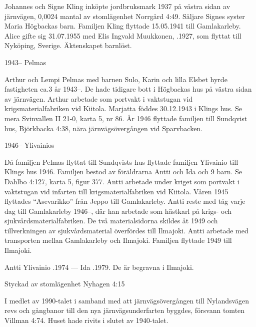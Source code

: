 Johannes och Signe Kling inköpte jordbruksmark 1937 på västra sidan av	järnvägen, 0,0024 mantal av stomlägenhet Norrgård 4:49. Säljare Signes syster Maria Högbackas barn.	Familjen Kling flyttade 15.05.1941 till Gamlakarleby. Alice gifte sig 31.07.1955 med Elis Ingvald Muukkonen, .1927, som flyttat till Nyköping, Sverige. Äktenskapet barnlöst.


1943--	Pelmas

Arthur och Lempi Pelmas med barnen Sulo, Karin och lilla Elsbet hyrde fastigheten ca.3 år 1943--. De hade tidigare bott i Högbackas hus på västra sidan av järnvägen. Arthur arbetade som portvakt i vaktstugan vid 	krigsmaterialfabriken vid Kiitola. Marjatta föddes 30.12.1943 i Klings hus. Se mera Svinvallen II 21-0, karta 5, nr 86. År 1946 flyttade familjen till Sundqvist hus, Björkbacka 4:38, nära järnvägsövergången vid Sparvbacken.

1946--	Ylivainios

Då familjen Pelmas flyttat till Sundqvists hus flyttade familjen Ylivainio till Klings hus 1946. Familjen bestod av föräldrarna Antti och Ida och 9 barn. Se Dahlbo 4:127, karta 5, figur 377. Antti arbetade under kriget som portvakt i vaktstugan vid infarten till krigsmaterialfabriken vid Kiitola. Våren 1945 flyttades ``Asevarikko'' från Jeppo till Gamlakarleby. Antti reste med tåg varje dag till Gamlakarleby 1946--, där han arbetade som hästkarl på krigs- och sjukvårdsmaterialfabriken. De två materialsidorna skildes åt 1949 och tillverkningen av sjukvårdsmaterial överfördes till Ilmajoki. Antti arbetade med transporten mellan Gamlakarleby och Ilmajoki. Familjen flyttade 1949 till Ilmajoki.

Antti Ylivainio .1974  ---  Ida .1979. De är begravna i Ilmajoki.



%

Styckad av stomlägenhet Nyhagen 4:15

%
I medlet av 1990-talet i samband med att järnvägsövergången till Nylandsvägen revs och gångbanor till den nya järnvägsunderfarten	byggdes, försvann tomten Villman 4:74. Huset hade rivits i slutet av 1940-talet.


